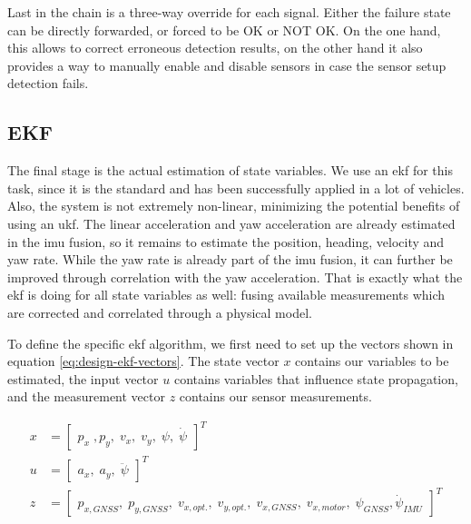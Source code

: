 Last in the chain is a three-way override for each signal. Either the failure state can be directly forwarded, or forced to be OK or NOT OK. On the one hand, this allows to correct erroneous detection results, on the other hand it also provides a way to manually enable and disable sensors in case the sensor setup detection fails.

\subsection{EKF}
The final stage is the actual estimation of state variables. We use an \gls{ekf} for this task, since it is the standard and has been successfully applied in a lot of vehicles. Also, the system is not extremely non-linear, minimizing the potential benefits of using an \gls{ukf}. The linear acceleration and yaw acceleration are already estimated in the \gls{imu} fusion, so it remains to estimate the position, heading, velocity and yaw rate. While the yaw rate is already part of the \gls{imu} fusion, it can further be improved through correlation with the yaw acceleration. That is exactly what the \gls{ekf} is doing for all state variables as well: fusing available measurements which are corrected and correlated through a physical model.

To define the specific \gls{ekf} algorithm, we first need to set up the vectors shown in equation \ref{eq:design-ekf-vectors}. The state vector $x$ contains our variables to be estimated, the input vector $u$ contains variables that influence state propagation, and the measurement vector $z$ contains our sensor measurements.

\begin{subequations}\label{eq:design-ekf-vectors}
\begin{alignat}{2}%
x &= \begin{bmatrix}p_x\;, p_y,\; v_x,\; v_y,\; \psi,\; \dot{\psi}\end{bmatrix}^T \\%
u &= \begin{bmatrix}a_x,\; a_y,\; \ddot{\psi}\end{bmatrix}^T \\%
z &= \begin{bmatrix}p_{x,\textit{GNSS}},\; p_{y,\textit{GNSS}},\; v_{x,opt.},\; v_{y,opt.},\; v_{x,\textit{GNSS}},\; v_{x,motor},\; \psi_{\textit{GNSS}}, \dot{\psi}_{\textit{IMU}}\end{bmatrix}^T
\end{alignat}
\end{subequations}

